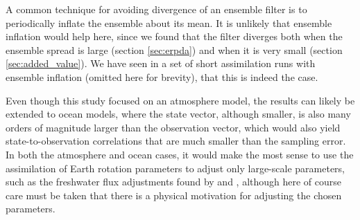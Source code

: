 A common technique for avoiding divergence of an ensemble filter is to periodically inflate the ensemble about its mean. 
It is unlikely that ensemble inflation would help here, since we found that the filter diverges both when the ensemble spread is large (section \ref{sec:erpda}) and when it is very small (section \ref{sec:added_value}). 
We have seen in a set of short assimilation runs with ensemble inflation (omitted here for brevity), that this is indeed the case. 


Even though this study focused on an atmosphere model, the results can likely be extended to ocean models, where the state vector, although smaller, is also many orders of magnitude larger than the observation vector, which would also yield state-to-observation correlations that are much smaller than the sampling error. 
In both the atmosphere and ocean cases, it would make the most sense to use the assimilation of Earth rotation parameters to adjust only large-scale parameters, such as the freshwater flux adjustments found by \citet{Saynisch2010} and \citet{Saynisch2012}, although here of course care must be taken that there is a physical motivation for adjusting the chosen parameters.  




